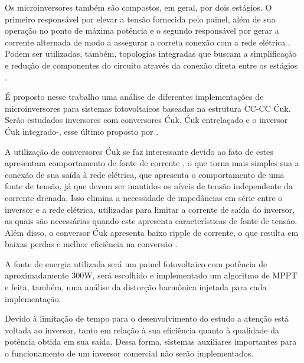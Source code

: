 \documentclass[
	12pt,				%
	openany,
	onseside,
	a4paper,			%
	english,			%
	french,				%
	spanish,			%
	brazil,				%
	]{abntex2}
\begin{document}
	Os microinversores também são compostos, em geral, por dois estágios. O primeiro responsável por elevar a tensão fornecida pelo painel, além de sua operação no ponto de máxima potência e o segundo responsável por gerar a corrente alternada de modo a assegurar a correta conexão com a rede elétrica \cite{Nezamuddin_des_eff_micro}. Podem ser utilizadas, também, topologias integradas que buscam a simplificação e redução de componentes do circuito através da conexão direta entre os estágios \cite{LUIGI_int_top} \cite{LUIGIJUNIOR_ev_int}.

	
	É proposto nesse trabalho uma análise de diferentes implementações de microinversores para sistemas fotovoltaicos baseadas na estrutura CC-CC Ćuk. Serão estudados inversores com conversores Ćuk, Ćuk entrelaçado e o inversor Ćuk integrado-, esse último proposto por \cite{LUIGI_int_top}.

	A utilização de conversores Ćuk se faz interessante devido ao fato de estes apresentam comportamento de fonte de corrente \cite{LUIGIJUNIOR_ev_int}, o que torna mais simples sua a conexão de sua saída à rede elétrica, que apresenta o comportamento de uma fonte de tensão, já que devem ser mantidos os níveis de tensão independente da corrente drenada. Isso elimina a necessidade de impedâncias em série entre o inversor e a rede elétrica, utilizadas para limitar a corrente de saída do inversor, as quais são necessárias quando este apresenta características de fonte de tensão. Além disso, o conversor Ćuk apresenta baixo ripple de corrente, o que resulta em baixas perdas e melhor eficiência na conversão \cite{Shawky_perform_anal}.

	A fonte de energia utilizada será um painel fotovoltaico com potência de aproximadamente 300W, será escolhido e implementado um algoritmo de MPPT e feita, também,  uma análise da distorção harmônica injetada para cada implementação.

	Devido à limitação de tempo para o desenvolvimento do estudo a atenção está voltada ao inversor, tanto em relação à sua eficiência quanto à qualidade da potência obtida em sua saída. Dessa forma, sistemas auxiliares importantes para o funcionamento de um inversor comercial não serão implementados.

	
\end{document}

